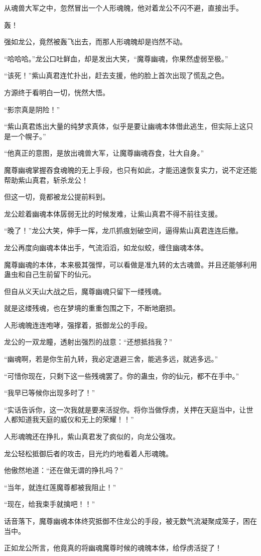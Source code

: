 \begin{this_body}
从魂兽大军之中，忽然冒出一个人形魂魄，他对着龙公不闪不避，直接出手。

轰！

强如龙公，竟然被轰飞出去，而那人形魂魄却是岿然不动。

“哈哈哈。”龙公口吐鲜血，却是发出大笑，“魔尊幽魂，你果然虚弱至极。”

“该死！”紫山真君连忙扑出，赶去支援，他的脸上首次出现了慌乱之色。

方源终于看明白一切，恍然大悟。

“影宗真是阴险！”

“紫山真君炼出大量的纯梦求真体，似乎是要让幽魂本体借此逃生，但实际上这只是一个幌子。”

“他真正的意图，是放出魂兽大军，让魔尊幽魂吞食，壮大自身。”

魔尊幽魂掌握吞食魂魄的无上手段，也只有如此，才能迅速恢复实力，说不定还能帮助紫山真君，斩杀龙公！

但这一切，竟都被龙公提前料到。

龙公趁着幽魂本体孱弱无比的时候发难，让紫山真君不得不前往支援。

“晚了！”龙公大笑，伸手一挥，龙爪抓痕划破空间，逼得紫山真君连连后撤。

龙公再度向幽魂本体出手，气流滔滔，如龙似蛟，缠住幽魂本体。

魔尊幽魂的本体，本来极其强悍，可以看做是准九转的太古魂兽。并且还能够利用蛊虫和自己生前留下的仙元。

但自从义天山大战之后，魔尊幽魂只留下一缕残魂。

就是这缕残魂，也在梦境的重重包围之下，不断地磨损。

人形魂魄连连咆哮，强撑着，抵御龙公的手段。

龙公的一双龙瞳，透射出强烈的战意：“还想抵挡我？”

“幽魂啊，若是你生前九转，我必定退避三舍，能逃多远，就逃多远。”

“可惜你现在，只剩下这一些残魂罢了。你的蛊虫，你的仙元，都不在手中。”

“我早已等候你出现多时了！”

“实话告诉你，这一次我就是要来活捉你。将你当做俘虏，关押在天庭当中，让世人都知道我天庭的威仪和无上的荣耀！！”

人形魂魄还在挣扎，紫山真君发了疯似的，向龙公强攻。

龙公轻松抵御后者的攻击，目光灼灼地看着人形魂魄。

他傲然地道：“还在做无谓的挣扎吗？”

“当年，就连红莲魔尊都被我阻止！”

“现在，给我束手就擒吧！！”

话音落下，魔尊幽魂本体终究抵御不住龙公的手段，被无数气流凝聚成笼子，困在当中。

正如龙公所言，他竟真的将幽魂魔尊时候的魂魄本体，给俘虏活捉了！

\end{this_body}

